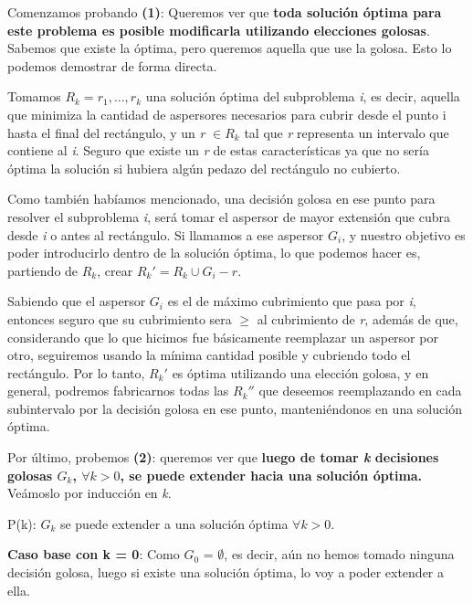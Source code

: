 \documentclass[./main.tex]{subfiles}
\begin{document}
Comenzamos probando \textbf{(1)}: Queremos ver que \textbf{toda solución óptima para este problema es posible modificarla utilizando elecciones golosas}. Sabemos que existe la óptima, pero queremos aquella que use la golosa. Esto lo podemos demostrar de forma directa. \newline 

Tomamos \(R_{k} = r_{1}, \ldots, r_{k}\) una solución óptima del subproblema \textit{i}, es decir, aquella que minimiza la cantidad de aspersores necesarios para cubrir desde el punto i hasta el final del rectángulo, y un \textit{r} \(\in R_{k}\) tal que \textit{r} representa un intervalo que contiene al \textit{i}. Seguro que existe un \textit{r} de estas características ya que no sería óptima la solución si hubiera algún pedazo del rectángulo no cubierto. \newline

Como también habíamos mencionado, una decisión golosa en ese punto para resolver el subproblema \textit{i}, será tomar el aspersor de mayor extensión que cubra desde \textit{i} o antes al rectángulo.
Si llamamos a ese aspersor \(G_{i}\), y nuestro objetivo es poder introducirlo dentro de la solución óptima, lo que podemos hacer es, partiendo de \(R_{k}\), crear \(R_{k}' = R_{k} \cup G_{i} - r\). \newline 

Sabiendo que el aspersor $G_{i}$ es el de máximo cubrimiento que pasa por \textit{i}, entonces seguro que su cubrimiento sera $\geq$ al cubrimiento de \textit{r}, además de que, considerando que lo que hicimos fue básicamente reemplazar un aspersor por otro, seguiremos usando la mínima cantidad posible y cubriendo todo el rectángulo. Por lo tanto, $ R_{k}'$ es óptima utilizando una elección golosa, y en general, podremos fabricarnos todas las $ R_{k}''$ que deseemos reemplazando en cada subintervalo por la decisión golosa en ese punto, manteniéndonos en una solución óptima.\done\newline\newline

Por último, probemos \textbf{(2)}: queremos ver que \textbf{luego de tomar \textit{k} decisiones golosas $G_{k}$, $\forall k > 0$, se puede extender hacia una solución óptima.} Veámoslo por inducción en \textit{k}. \newline 

P(k): $G_{k}$ se puede extender a una solución óptima $\forall k > 0$. \newline

\textbf{Caso base con k = 0}: Como $G_{0}$ = $\emptyset$, es decir, aún no hemos tomado ninguna decisión golosa, luego si existe una solución óptima, lo voy a poder extender a ella.  \newline
\end{document}
